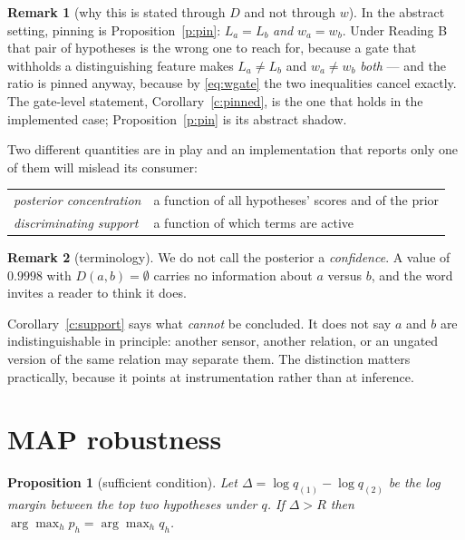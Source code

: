 \documentclass[11pt,a4paper]{article}
\newtheorem{proposition}{Proposition}
\theoremstyle{definition}
\newtheorem{remark}{Remark}
\begin{document}
\begin{remark}[why this is stated through $D$ and not through $w$]
In the abstract setting, pinning is Proposition~\ref{p:pin}: $L_a=L_b$
\emph{and} $w_a=w_b$. Under Reading B that pair of hypotheses is the wrong one
to reach for, because a gate that withholds a distinguishing feature makes
$L_a\ne L_b$ and $w_a\ne w_b$ \emph{both} --- and the ratio is pinned anyway,
because by \eqref{eq:wgate} the two inequalities cancel exactly. The
gate-level statement, Corollary~\ref{c:pinned}, is the one that holds in the
implemented case; Proposition~\ref{p:pin} is its abstract shadow.
\end{remark}

Two different quantities are in play and an implementation that reports only
one of them will mislead its consumer:

\begin{center}
\begin{tabular}{ll}
\toprule
\emph{posterior concentration} & a function of all hypotheses' scores and of
the prior \\
\emph{discriminating support} & a function of which terms are active \\
\bottomrule
\end{tabular}
\end{center}

\begin{remark}[terminology]
We do not call the posterior a \emph{confidence}. A value of $0.9998$ with
$D(a,b)=\emptyset$ carries no information about $a$ versus $b$, and the word
invites a reader to think it does.
\end{remark}

Corollary~\ref{c:support} says what \emph{cannot} be concluded. It does not
say $a$ and $b$ are indistinguishable in principle: another sensor, another
relation, or an ungated version of the same relation may separate them. The
distinction matters practically, because it points at instrumentation rather
than at inference.

\section{MAP robustness}

\begin{proposition}[sufficient condition]\label{p:map}
Let $\Delta=\log q_{(1)}-\log q_{(2)}$ be the log margin between the top two
hypotheses under $q$. If $\Delta>R$ then
$\arg\max_h p_h=\arg\max_h q_h$.
\end{proposition}
\end{document}

